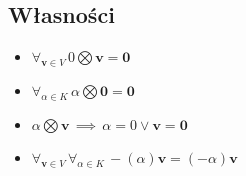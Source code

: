 \documentclass{article}
\begin{document}
\subsection{Własności}
\begin{itemize}
    \item $\forall_{\mathbf{v}\in V}\, 0\bigotimes\mathbf{v} = \mathbf{0}$
    \item $\forall_{\alpha\in K}\, \alpha\bigotimes\mathbf{0} = \mathbf{0}$
    \item $\alpha\bigotimes\mathbf{v}\,\implies\, \alpha = 0 \lor \mathbf{v} = \mathbf{0}$
    \item $\forall_{\mathbf{v}\in V}\,\forall_{\alpha \in K}\, -(\alpha)\mathbf{v}=(-\alpha)\mathbf{v}$
\end{itemize}

\end{document}
